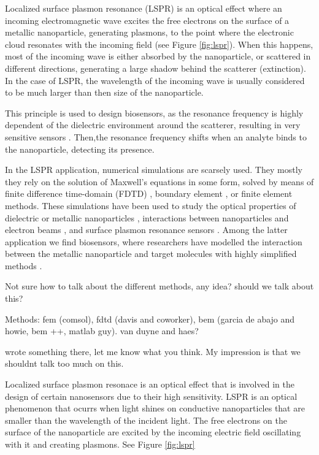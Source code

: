 Localized surface plasmon resonance (LSPR) is an optical effect where an incoming 
electromagnetic wave excites the free electrons on the surface of a metallic nanoparticle,
generating plasmons, to the point where the electronic cloud resonates with the incoming
field (see Figure \ref{fig:lspr}). When this happens, most of the incoming wave 
is either absorbed by the nanoparticle, or scattered in different directions,
generating a large shadow behind the scatterer (extinction). In the case of LSPR,
the wavelength of the incoming wave is usually considered to be much larger than 
then size of the nanoparticle.

This principle is used to design 
biosensors, as the resonance frequency is highly dependent of the dielectric environment 
around the scatterer, resulting in very sensitive sensors \cite{HaesETal2004, HaesVanduyne2002}. 
Then,the resonance frequency shifts when an analyte binds to the nanoparticle, detecting its presence. 

In the LSPR application, numerical simulations are scarsely used. They mostly they rely on the 
solution of Maxwell's equations in some form, solved by means of finite difference time-domain (FDTD) \cite{},
boundary element \cite{}, or finite element \cite{} methods. 
These simulations have been used to study the 
optical properties of dielectric or metallic nanoparticles \cite{Hohenester2018,
JungPedersenSondergaardPedersenLarsenNielsen2010, VideenSun2003,
MayergoyzFredkinZhang2005, MayergoyzZhang2007}, interactions between nanoparticles
and electron beams \cite{GarciadeabajoAizpurua1997, GarciadeabajoHowie2002},
and surface plasmon resonance sensors \cite{JungCampbellChinowskyMarYee1998}.
Among the latter application we find biosensors, where researchers have modelled the 
interaction between the metallic nanoparticle and target molecules with highly 
simplified methods \cite{}.


{\color{red} Not sure how to talk about the different methods, any idea? should
we talk about this? 

Methods: fem (comsol), fdtd (davis and coworker), bem (garcia de abajo and 
howie, bem ++, matlab guy). van duyne and haes? }
{\color{blue} wrote something there, let me know what you think. My impression is that
we shouldnt talk too much on this.}

Localized surface plasmon resonace is an optical effect that is involved in the
design of certain nanosensors due to their high sensitivity. LSPR is an 
optical phenomenon that ocurrs when light shines on conductive nanoparticles
that are smaller than the wavelength of the incident light. The free electrons
on the surface of the nanoparticle are excited by the incoming electric field
oscillating with it and creating plasmons. See Figure \ref{fig:lspr}

